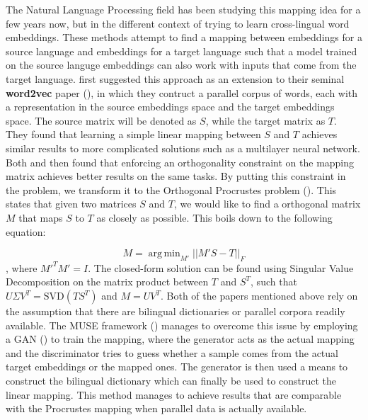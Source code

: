 \documentclass[12pt]{extreport}
\DeclareMathOperator*{\argmin}{arg\,min}
\begin{document}
The Natural Language Processing field has been studying this mapping idea for a few years now, but in the different context of trying to learn cross-lingual word embeddings. These methods attempt to find a mapping between embeddings for a source language and embeddings for a target language such that a model trained on the source languge embeddings can also work with inputs that come from the target language. \cite{mikolov2013distributed} first suggested this approach as an extension to their seminal \textbf{word2vec} paper (\cite{word2vec}), in which they contruct a parallel corpus of words, each with a representation in the source embeddings space and the target embeddings space. The source matrix will be denoted as $S$, while the target matrix as $T$. They found that learning a simple linear mapping between $S$ and $T$ achieves similar results to more complicated solutions such as a multilayer neural network. Both \cite{normalized-word-embbedings} and \cite{principle-bilingual-mappings} then found that enforcing an orthogonality constraint on the mapping matrix achieves better results on the same tasks. By putting this constraint in the problem, we transform it to the Orthogonal Procrustes problem (\cite{procrustes}). This states that given two matrices $S$ and $T$, we would like to find a orthogonal matrix $M$ that maps $S$ to $T$ as closely as possible. This boils down to the following equation:

\begin{equation}
    M = \argmin_{M'} ||M' S - T ||_F
\end{equation}
, where $M'^T M' = I$. The closed-form solution can be found using Singular Value Decomposition on the matrix product between $T$ and $S^T$, such that $U\Sigma V^T = \text{SVD}(TS^T)$ and $M = UV^T$. Both of the papers mentioned above rely on the assumption that there are bilingual dictionaries or parallel corpora readily available. The MUSE framework (\cite{muse}) manages to overcome this issue by employing a GAN (\cite{gan}) to train the mapping, where the generator acts as the actual mapping and the discriminator tries to guess whether a sample comes from the actual target embeddings or the mapped ones. The generator is then used a means to construct the bilingual dictionary which can finally be used to construct the linear mapping. This method manages to achieve results that are comparable with the Procrustes mapping when parallel data is actually available.
\end{document}
